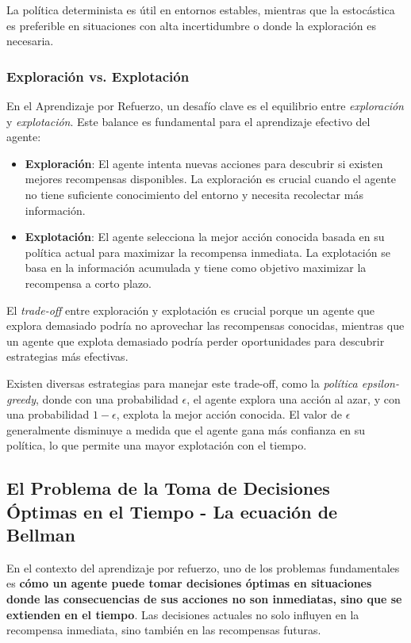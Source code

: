 \documentclass[a4paper,12pt, twoside]{report}
\begin{document}
La política determinista es útil en entornos estables, mientras que la estocástica es preferible en situaciones con alta incertidumbre o donde la exploración es necesaria.


\subsubsection{Exploración vs. Explotación}

En el Aprendizaje por Refuerzo, un desafío clave es el equilibrio entre \textit{exploración} y 
\textit{explotación}. Este balance es fundamental para el aprendizaje efectivo del agente:

\begin{itemize}
    \item \textbf{Exploración}: El agente intenta nuevas acciones para descubrir si existen mejores 
    recompensas disponibles. La exploración es crucial cuando el agente no tiene suficiente conocimiento 
    del entorno y necesita recolectar más información.
    \item \textbf{Explotación}: El agente selecciona la mejor acción conocida basada en su 
    política actual para maximizar la recompensa inmediata. La explotación se basa en la información 
    acumulada y tiene como objetivo maximizar la recompensa a corto plazo.
\end{itemize}

El \textit{trade-off} entre exploración y explotación es crucial porque un agente que explora 
demasiado podría no aprovechar las recompensas conocidas, mientras que un agente que explota 
demasiado podría perder oportunidades para descubrir estrategias más efectivas. 

Existen diversas estrategias para manejar este trade-off, como la \textit{política epsilon-greedy}, 
donde con una probabilidad \(\epsilon\), el agente explora una acción al azar, y con 
una probabilidad \(1-\epsilon\), explota la mejor acción conocida. El valor de \(\epsilon\) 
generalmente disminuye a medida que el agente gana más confianza en su política, lo que permite 
una mayor explotación con el tiempo.


\subsection{El Problema de la Toma de Decisiones Óptimas en el Tiempo - La ecuación de Bellman}


En el contexto del aprendizaje por refuerzo, uno de los problemas fundamentales es 
\textbf{cómo un agente puede tomar decisiones óptimas en situaciones donde las consecuencias de 
sus acciones no son inmediatas, sino que se extienden en el tiempo}. Las decisiones actuales no 
solo influyen en la recompensa inmediata, sino también en las recompensas futuras. 
\end{document}
